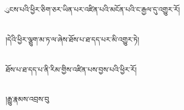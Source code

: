 ུངས་པའི་ཕྱིར་ཅིག་ཅར་ཡིན་པར་འཛིན་པའི་མངོན་པའི་ང་རྒྱལ་དུ་འགྱུར་རོ།\chapter{ }།དེའི་ཕྱིར་ལྕུག་མ་ཏ་ལ་ཞེས་ཐོས་པ་ཐ་དད་པར་མི་འགྱུར་ཏེ།\chapter{ }ཐོས་པ་ཐ་དད་པ་ནི་རིམ་གྱིས་འཛིན་པས་བྱས་པའི་ཕྱིར་རོ།\chapter{ }།རྒྱུ་རྣམས་འབྲས་བུ